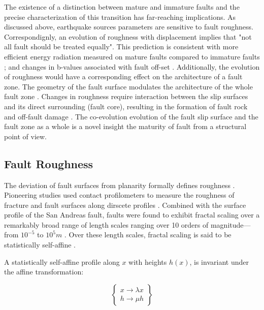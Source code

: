 \documentclass[12pt,a4paper]{article}
\begin{document}
The existence of a distinction between mature and immature faults and the precise characterization of this transition has far-reaching implications. As discussed above, earthquake sources parameters are sensitive to fault roughness. Correspondignly, an evolution of roughness with displacement implies that "not all fault should be treated equally". This prediction is consistent with more efficient energy radiation measured on mature faults compared to immature faults \cite{harrington2009smooth}; and changes in b-values associated with fault off-set \cite{stirling1996fault}. Additionally, the evolution of roughness would have a corresponding effect on the architecture of a fault zone.  The geometry of the fault surface modulates the architecture of the whole fault zone \cite{chester2000stress, griffith2010rough, ritz2015influence}. Changes in roughness require interaction between the slip surfaces and its direct surrounding (fault core), resulting in the formation of fault rock \cite{power1988roughness} and off-fault damage \cite{griffith2010rough, ritz2015influence}. The co-evolution evolution of the fault slip surface and the fault zone as a whole is a novel insight the maturity of fault from a structural point of view.
	
\subsection{Fault Roughness}

The deviation of fault surfaces from planarity formally defines roughness \cite{brown1985broad}. Pioneering studies used contact profilometers to measure the roughness of fracture and fault surfaces along  dirscete profiles \cite{mandelbrot1984fractal, brown1985broad, scholz1986fractal, power1987roughness, power1991euclidean}. Combined with the surface profile of the San Andreas fault, faults were found to exhibit fractal scaling over a remarkably broad range of length scales ranging over 10 orders of magnitude—from $10^{-5}$ to $10^5 m$ \cite{scholz1986fractal, power1987roughness, aviles1987fractal}. Over these length scales, fractal scaling is said to be statistically self-affine \cite{mandelbrot1984fractal, mandelbrot1985self}. 
	
A statistically self-affine profile along $x$ with heights $h(x)$, is invariant under the affine transformation:

\begin{equation}
\left\lbrace
  \begin{matrix}
   	x \rightarrow \lambda x \\
    h \rightarrow \mu h
  \end{matrix}
\right\rbrace
\end{equation}
\end{document}
